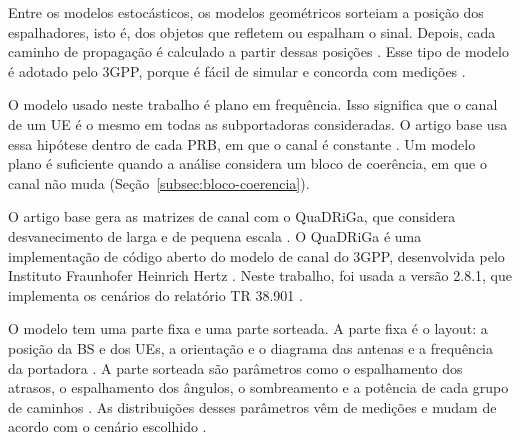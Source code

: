 Entre os modelos estocásticos, os modelos geométricos sorteiam a posição dos espalhadores, isto é, dos objetos que refletem ou espalham o sinal. Depois, cada caminho de propagação é calculado a partir dessas posições \cite[p.~330]{bjornson-mimo}. Esse tipo de modelo é adotado pelo 3GPP, porque é fácil de simular e concorda com medições \cite[p.~330--331]{bjornson-mimo}.

O modelo usado neste trabalho é plano em frequência. Isso significa que o canal de um UE é o mesmo em todas as subportadoras consideradas. O artigo base usa essa hipótese dentro de cada PRB, em que o canal é constante \cite{zhao-lmmse}. Um modelo plano é suficiente quando a análise considera um bloco de coerência, em que o canal não muda \cite[p.~330]{bjornson-mimo} (Seção~\ref{subsec:bloco-coerencia}).



O artigo base gera as matrizes de canal com o QuaDRiGa, que considera desvanecimento de larga e de pequena escala \cite{zhao-lmmse}. O QuaDRiGa é uma implementação de código aberto do modelo de canal do 3GPP, desenvolvida pelo Instituto Fraunhofer Heinrich Hertz \cite[p.~342]{bjornson-mimo}. Neste trabalho, foi usada a versão 2.8.1, que implementa os cenários do relatório TR 38.901 \cite{quadriga-manual, tr38901}.

O modelo tem uma parte fixa e uma parte sorteada. A parte fixa é o layout: a posição da BS e dos UEs, a orientação e o diagrama das antenas e a frequência da portadora \cite[p.~340--341]{bjornson-mimo}. A parte sorteada são parâmetros como o espalhamento dos atrasos, o espalhamento dos ângulos, o sombreamento e a potência de cada grupo de caminhos \cite[p.~341]{bjornson-mimo}. As distribuições desses parâmetros vêm de medições e mudam de acordo com o cenário escolhido \cite[p.~341]{bjornson-mimo}.

